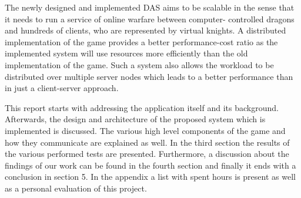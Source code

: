\documentclass{article}
\begin{document}
The newly designed and implemented DAS aims to be scalable in the sense that it needs to run a service of online warfare between computer- controlled dragons and hundreds of clients, who are represented by virtual knights. 
A distributed implementation of the game provides a better performance-cost ratio as the implemented system will use resources more efficiently than the old implementation of the game.
Such a system also allows the workload to be distributed over multiple server nodes which leads to a better performance than in just a client-server approach.

This report starts with addressing the application itself and its background.
Afterwards, the design and architecture of the proposed system which is implemented is discussed.
The various high level components of the game and how they communicate are explained as well.
In the third section the results of the various performed tests are presented. 
Furthermore, a discussion about the findings of our work can be found in the fourth section and finally it ends with a conclusion in section 5. In the appendix a list with spent hours is present as well as a personal evaluation of this project.

\newpage









  


\end{document}
